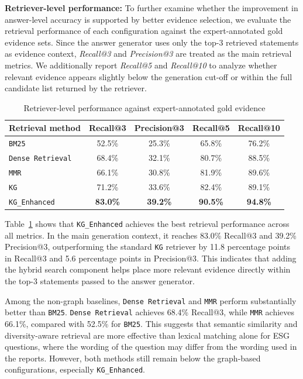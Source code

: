 \documentclass[sn-mathphys, oneside]{sn-jnl}
\begin{document}
\textbf{Retriever-level performance: }To further examine whether the improvement in answer-level accuracy is supported by
better evidence selection, we evaluate the retrieval performance of each configuration
against the expert-annotated gold evidence sets. Since the answer generator uses only
the top-3 retrieved statements as evidence context, \textit{Recall@3} and
\textit{Precision@3} are treated as the main retrieval metrics. We additionally report
\textit{Recall@5} and \textit{Recall@10} to analyze whether relevant evidence appears
slightly below the generation cut-off or within the full candidate list returned by
the retriever.

\begin{table}[htbp]
    \centering
    \caption{Retriever-level performance against expert-annotated gold evidence}
    \label{tab:retrieval_performance}
    \begin{tabular}{lcccc}
    \toprule
    Retrieval method & Recall@3 & Precision@3 & Recall@5 & Recall@10 \\
    \midrule
    \texttt{BM25} & 52.5\% & 25.3\% & 65.8\% & 76.2\% \\
    \texttt{Dense Retrieval} & 68.4\% & 32.1\% & 80.7\% & 88.5\% \\
    \texttt{MMR} & 66.1\% & 30.8\% & 81.9\% & 89.6\% \\
    \texttt{KG} & 71.2\% & 33.6\% & 82.4\% & 89.1\% \\
    \texttt{KG\_Enhanced} & \textbf{83.0\%} & \textbf{39.2\%} & \textbf{90.5\%} & \textbf{94.8\%} \\
    \bottomrule
    \end{tabular}
\end{table}

Table~\ref{tab:retrieval_performance} shows that \texttt{KG\_Enhanced} achieves the
best retrieval performance across all metrics. In the main generation context, it
reaches 83.0\% Recall@3 and 39.2\% Precision@3, outperforming the standard
\texttt{KG} retriever by 11.8 percentage points in Recall@3 and 5.6 percentage points
in Precision@3. This indicates that adding the hybrid search component helps place
more relevant evidence directly within the top-3 statements passed to the answer
generator.

Among the non-graph baselines, \texttt{Dense Retrieval} and \texttt{MMR} perform
substantially better than \texttt{BM25}. \texttt{Dense Retrieval} achieves 68.4\%
Recall@3, while \texttt{MMR} achieves 66.1\%, compared with 52.5\% for
\texttt{BM25}. This suggests that semantic similarity and diversity-aware retrieval
are more effective than lexical matching alone for ESG questions, where the wording
of the question may differ from the wording used in the reports. However, both
methods still remain below the graph-based configurations, especially
\texttt{KG\_Enhanced}.
\end{document}
